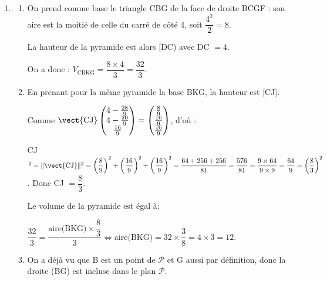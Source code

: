 \begin{enumerate}
\begin{enumerate}
D'autre part B$(4~;~0~;~0) \in \mathcal{P} \iff 4 + 2 \times 0 - 2 \times 0 - 4 = 0$, qui est vraie donc B est un point de $\mathcal{P}$ et bien sur de (ABC).

Conclusion : les deux points B et K sont communs aux deux plans, donc l'intersection des plans $\mathcal{P}$ et (ABC) est la droite (BK).
	\end{enumerate}
	
\item %
	\begin{enumerate}
		\item %
		On prend comme base le triangle CBG de la face de droite BCGF  : son aire est la moitié de celle du carré de côté 4, soit $\dfrac{4^2}{2} = 8$.
		
La hauteur de la pyramide est alors [DC) avec DC $= 4$.

On a donc : $V_{\text{CBKG}} = \dfrac{8 \times 4}{3} = \dfrac{32}{3}$.
		\item %
En prenant pour la même pyramide la base BKG, la hauteur est [CJ].
		
Comme $\vect{\text{CJ}}\begin{pmatrix}4 - \frac{28}{9}\\4 - \frac{20}{9}\\ \frac{16}{9}\end{pmatrix} = \begin{pmatrix}\frac89\\\frac{16}{9}\\\frac{16}{9} \end{pmatrix}$, d'où :
		
CJ$^2 = \|\vect{\text{CJ}}\|^2 = \left(\dfrac89\right)^2 + \left(\dfrac{16}{9}\right)^2  + \left(\dfrac{16}{9}\right)^2 = \dfrac{64 + 256 + 256}{81} = \dfrac{576}{81} = \dfrac{9 \times 64}{9 \times 9} = \dfrac{64}{9} = \left(\dfrac83\right)^2$. Donc CJ $= \dfrac83$.

Le volume de la pyramide est égal à:

$\dfrac{32}{3} = \dfrac{\text{aire(BKG)} \times \dfrac83}{3} \iff \text{aire(BKG)} = 32 \times \dfrac38 = 4 \times 3 = 12$.

		\item %
		On a déjà vu que B est un point de $\mathcal{P}$ et G aussi par définition, donc la droite (BG) est incluse dans le plan $\mathcal{P}$.


\end{enumerate}
\end{enumerate}
